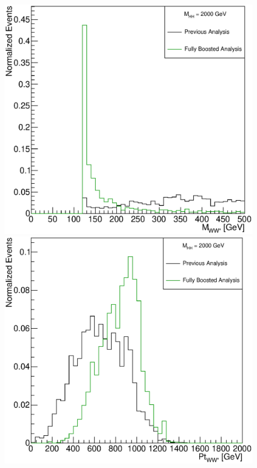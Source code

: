 \begin{figure}[h]
\begin{center}
\includegraphics[scale=0.33]{figures/WHad_plots_john_withcuts/electron/hww_m_Xhh2000}
\includegraphics[scale=0.33]{figures/WHad_plots_john_withcuts/electron/hww_pt_Xhh2000}\\

\end{center}
\end{figure}
